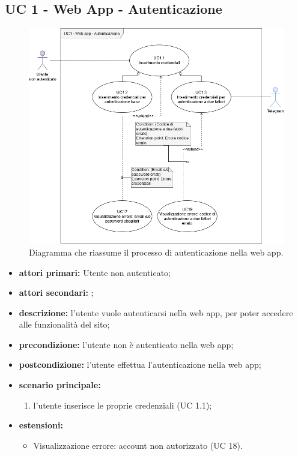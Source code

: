 	\subsection{UC 1 - Web App - Autenticazione}
		
	\begin{figure}[H]
		\centering
		\includegraphics[scale=0.60]{res/images/uc1}
		\caption{Diagramma che riassume il processo di autenticazione nella web app.}
	\end{figure}
		
	\begin{itemize}
		\item \textbf{attori primari:} Utente non autenticato;
		\item \textbf{attori secondari:} ;
		\item \textbf{descrizione:} l'utente vuole autenticarsi nella web app, per poter accedere alle funzionalità del sito;
		\item \textbf{precondizione:} l'utente non è autenticato nella web app;
		\item \textbf{postcondizione:} l'utente effettua l'autenticazione nella web app;
		\item \textbf{scenario principale:}
		\begin{enumerate}
			\item l'utente inserisce le proprie credenziali (UC 1.1);
		\end{enumerate}
		\item \textbf{estensioni:}
		\begin{itemize}
			\item Visualizzazione errore: account non autorizzato (UC 18).
		\end{itemize}
	\end{itemize}
	

